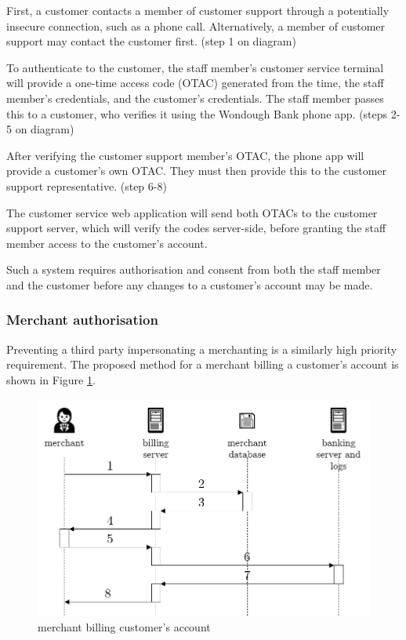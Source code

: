 First, a customer contacts a member of customer support through a potentially insecure connection, such as a phone call. Alternatively, a member of customer support may contact the customer first. (step 1 on diagram)

To authenticate to the customer, the staff member’s customer service terminal will provide a one-time access code (OTAC) generated from the time, the staff member’s credentials, and the customer’s credentials. The staff member passes this to a customer, who verifies it using the Wondough Bank phone app. (steps 2-5 on diagram)

After verifying the customer support member’s OTAC, the phone app will provide a customer’s own OTAC. They must then provide this to the customer support representative. (step 6-8)

The customer service web application will send both OTACs to the customer support server, which will verify the codes server-side, before granting the staff member access to the customer’s account.

Such a system requires authorisation and consent from both the staff member and the customer before any changes to a customer’s account may be made.

\subsubsection{Merchant authorisation}

Preventing a third party impersonating a merchanting is a similarly high priority requirement.  The proposed method for a merchant billing a customer’s account is shown in Figure \ref{merchantBilling}.

\begin{figure}
    \includegraphics[width=\columnwidth]{images/merchant-billing}
    \caption{merchant billing customer’s account}
    \centering
    \label{merchantBilling}
\end{figure}


